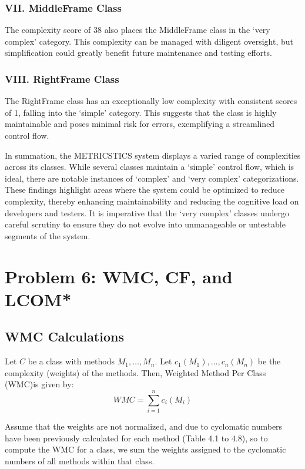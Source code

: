 \documentclass[english,12pt,a4paper]{report}
\begin{document}
	\subsection*{VII. MiddleFrame Class}
	The complexity score of 38 also places the MiddleFrame class in the `very complex' category. This complexity can be managed with diligent oversight, but simplification could greatly benefit future maintenance and testing efforts.
	
	\subsection*{VIII. RightFrame Class}
	The RightFrame class has an exceptionally low complexity with consistent scores of 1, falling into the `simple' category. This suggests that the class is highly maintainable and poses minimal risk for errors, exemplifying a streamlined control flow.
	
	\vspace{10pt}
	In summation, the METRICSTICS system displays a varied range of complexities across its classes. While several classes maintain a `simple' control flow, which is ideal, there are notable instances of `complex' and `very complex' categorizations. These findings highlight areas where the system could be optimized to reduce complexity, thereby enhancing maintainability and reducing the cognitive load on developers and testers. It is imperative that the `very complex' classes undergo careful scrutiny to ensure they do not evolve into unmanageable or untestable segments of the system.
	
	
	\chapter{Problem 6: WMC, CF, and LCOM*}
	\section{WMC Calculations}
	Let $C$ be a class with methods $M_1, \ldots, M_n$. Let $c_1(M_1), \ldots, c_n(M_n)$ be the complexity (weights) of the methods. Then, Weighted Method Per Class (WMC)is given by:
	\begin{equation}
		 WMC = \sum_{i=1}^{n} c_i(M_i)
	\tag{Equation 17}
	\end{equation}
	
	Assume that the weights are not normalized, and due to cyclomatic numbers have
	been previously calculated for each method (Table 4.1 to 4.8), so to compute the WMC for a class, we sum the	weights assigned to the cyclomatic numbers of all methods within that class.
\end{document}
